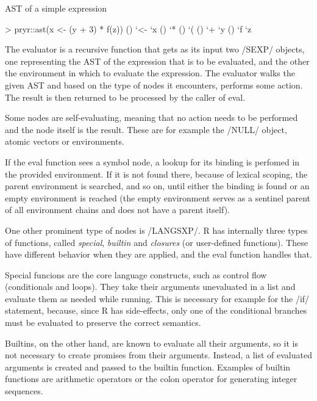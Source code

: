 {\begin{listing}[htbp]
  \caption{\label{lst:ast}AST of a simple expression}
  \begin{rcode}
> pryr::ast(x <- (y + 3) * f(z))
\- ()
  \- `<-
  \- `x
  \- ()
    \- `*
    \- ()
      \- `(
      \- ()
        \- `+
        \- `y
    \- ()
      \- `f
      \- `z
  \end{rcode}
\end{listing}

The evaluator is a recursive function that gets as its input two \cinline/SEXP/ objects, one representing the AST of the expression that is to be evaluated, and the other the environment in which to evaluate the expression. The evaluator walks the given AST and based on the type of nodes it encounters, performs some action. The result is then returned to be processed by the caller of eval.

Some nodes are self-evaluating, meaning that no action needs to be performed and the node itself is the result. These are for example the \rinline/NULL/ object, atomic vectors or environments.

If the eval function sees a symbol node, a lookup for its binding is perfomed in the provided environment. If it is not found there, because of lexical scoping, the parent environment is searched, and so on, until either the binding is found or an empty environment is reached (the empty environment serves as a sentinel parent of all environment chains and does not have a parent itself).

One other prominent type of nodes is \cinline/LANGSXP/. R has internally three types of functions, called \emph{special}, \emph{builtin} and \emph{closures} (or user-defined functions). These have different behavior when they are applied, and the eval function handles that.

Special funcions are the core language constructs, such as control flow (conditionals and loops). They take their arguments unevaluated in a list and evaluate them as needed while running. This is necessary for example for the \rinline/if/ statement, because, since R has side-effects, only one of the conditional branches must be evaluated to preserve the correct semantics.

Builtins, on the other hand, are known to evaluate all their arguments, so it is not necessary to create promises from their arguments. Instead, a list of evaluated arguments is created and passed to the builtin function. Examples of builtin functions are arithmetic operators or the colon operator for generating integer sequences.

}
